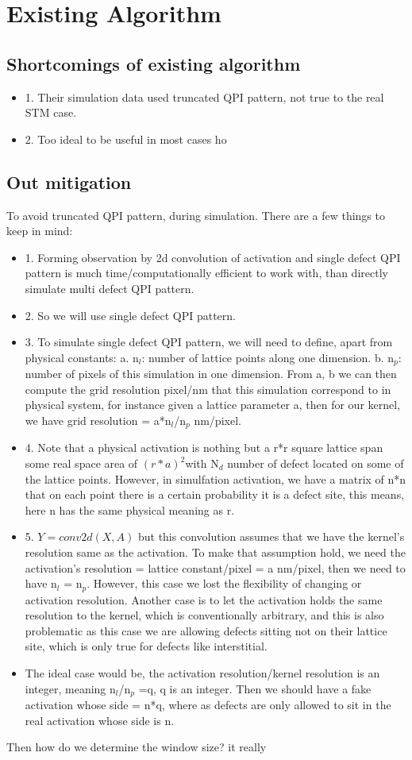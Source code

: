 \section{Existing Algorithm}
\subsection{Shortcomings of existing algorithm}
\begin{itemize}
	\item 1. Their simulation data used truncated QPI pattern, not true to the real STM case. 
	\item 2. Too ideal to be useful in most cases ho
\end{itemize}
\subsection{Out mitigation}
To avoid truncated QPI pattern, during simulation. There are a few things to keep in mind: 
\begin{itemize}
	\item 1. Forming observation by 2d convolution of activation and single defect QPI pattern is much time/computationally efficient to work with, than directly simulate multi defect QPI pattern. 
	\item 2. So we will use single defect QPI pattern. 
	\item 3. To simulate single defect QPI pattern, we will need to define, apart from physical constants: a. n$_l$: number of lattice points along one dimension. b. n$_p$: number of pixels of this simulation in one dimension. From a, b we can then compute the grid resolution pixel/nm that this simulation correspond to in physical system, for instance given a lattice parameter a, then for our kernel, we have grid resolution = a*n$_l$/n$_p$ nm/pixel.
	\item 4. Note that a physical activation is nothing but a r*r square lattice span some real space area of $(r*a)^2$with N$_d$ number of defect located on some of the lattice points. However, in simulfation activation, we have a matrix of n*n that on each point there is a certain probability it is a defect site, this means, here n has the same physical meaning as r.
	\item 5. $Y=conv2d(X,A)$ but this convolution assumes that we have the kernel's resolution same as the activation. To make that assumption hold, we need the activation's resolution = lattice constant/pixel = a nm/pixel, then we need to have n$_l$ = n$_p$. However, this case we lost the flexibility of changing or activation resolution. Another case is to let the activation holds the same resolution to the kernel, which is conventionally arbitrary, and this is also problematic as this case we are allowing defects sitting not on their lattice site, which is only true for defects like interstitial.
	\item The ideal case would be, the  activation resolution/kernel resolution is an integer, meaning n$_l$/n$_p$ =q, q is an integer. Then we should have a fake activation whose side = n*q, where as defects are only allowed to sit in the real activation whose side is n.
\end{itemize}
Then how do we determine the window size? it really 

